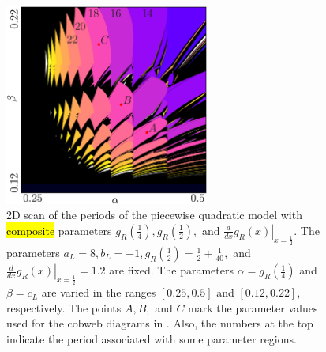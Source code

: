 \begin{figure}
	\centering
	\includegraphics[width=0.6\textwidth]{../Figures/5/5.9/result.png}
	\caption[2D scan of the periods of the quadratic model with composite parameters]{
	2D scan of the periods of the piecewise quadratic model with \hl{composite} parameters $g_R\left(\frac{1}{4}\right), g_R\left(\frac{1}{2}\right),$ and $\left. \frac{d}{dx} g_R\left(x\right) \right|_{x = \frac{1}{2}}$.
	The parameters $a_L = 8, b_L = -1, g_R\left(\frac{1}{2}\right) = \frac{1}{2} + \frac{1}{40},$ and $\left. \frac{d}{dx} g_R\left(x\right) \right|_{x = \frac{1}{2}} = 1.2$ are fixed.
	The parameters $\alpha = g_R\left(\frac{1}{4}\right)$ and $\beta = c_L$ are varied in the ranges $[0.25, 0.5]$ and $[0.12, 0.22]$, respectively.
	The points $A, B,$ and $C$ mark the parameter values used for the cobweb diagrams in .
	Also, the numbers at the top indicate the period associated with some parameter regions.
	}
	\label{fig:setup.quad.hyper.1.period}
\end{figure}

